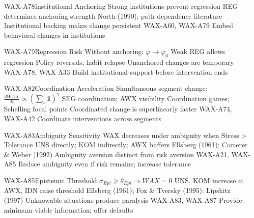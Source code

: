 \begin{axiomspec}{WAX-A78}{Institutional Anchoring}
 Strong institutions prevent regression
 REG determines anchoring strength
 North (1990); path dependence literature
 Institutional backing makes change persistent
 WAX-A60, WAX-A79
 Embed behavioral changes in institutions
\end{axiomspec}

\begin{axiomspec}{WAX-A79}{Regression Risk}
 Without anchoring: $\varphi \rightarrow \varphi_0$
 Weak REG allows regression
 Policy reversals; habit relapse
 Unanchored changes are temporary
 WAX-A78, WAX-A33
 Build institutional support before intervention ends
\end{axiomspec}

\begin{axiomspec}{WAX-A82}{Coordination Acceleration}
 Simultaneous segment change: $\frac{dWAX}{dt} \propto (\sum_s \mathbb{1})^\gamma$
 SEG coordination; AWX visibility
 Coordination games; Schelling focal points
 Coordinated change is superlinearly faster
 WAX-A74, WAX-A42
 Coordinate interventions across segments
\end{axiomspec}


\begin{axiomspec}{WAX-A83}{Ambiguity Sensitivity}
 WAX decreases under ambiguity when Stress > Tolerance
 UNS directly; KOM indirectly; AWX buffers
 Ellsberg (1961); Camerer \& Weber (1992)
 Ambiguity aversion distinct from risk aversion
 WAX-A21, WAX-A85
 Reduce ambiguity even if risk remains; increase tolerance
\end{axiomspec}

\begin{axiomspec}{WAX-A85}{Epistemic Threshold}
 $\sigma_{Epi} \geq \theta_{Epi} \Rightarrow WAX = 0$
 UNS, KOM increase σ; AWX, IDN raise threshold
 Ellsberg (1961); Fox \& Tversky (1995); Lipshitz (1997)
 Unknowable situations produce paralysis
 WAX-A83, WAX-A87
 Provide minimum viable information; offer defaults
\end{axiomspec}

